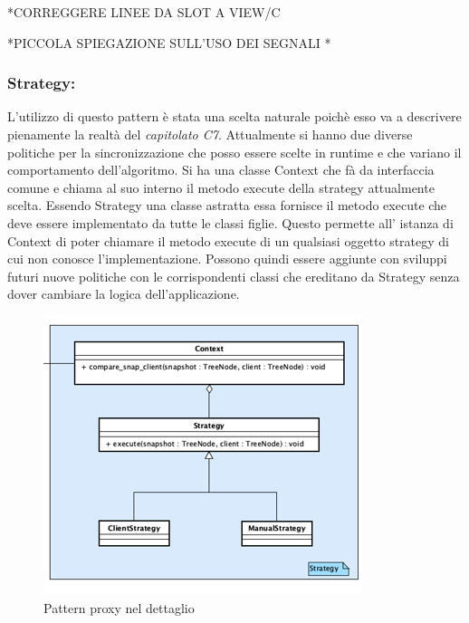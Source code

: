 *CORREGGERE LINEE DA SLOT A VIEW/C

*PICCOLA SPIEGAZIONE SULL'USO DEI SEGNALI *

\subsubsection{Strategy:}
L'utilizzo di questo pattern è stata una scelta naturale poichè esso va a descrivere pienamente la realtà del \textit{capitolato C7}.\newline{}
Attualmente si hanno due diverse politiche per la sincronizzazione che posso essere scelte in runtime e che variano il comportamento dell'algoritmo. Si ha una classe Context che fà da interfaccia comune e chiama al suo interno il metodo execute della strategy attualmente scelta. Essendo Strategy una classe astratta essa fornisce il metodo execute che deve essere implementato da tutte le classi figlie. Questo permette all' istanza di Context di poter chiamare il metodo execute di un qualsiasi oggetto strategy di cui non conosce l'implementazione. Possono quindi essere aggiunte con sviluppi futuri nuove politiche con le corrispondenti classi che ereditano da Strategy senza dover cambiare la logica dell'applicazione.

\begin{figure}[H]
    \centering
    \includegraphics[scale = 0.8]{components/img/strategy-model.png}
    \caption{Pattern proxy nel dettaglio}
    \label{fig:Pattern proxy nel dettaglio}
\end{figure}
